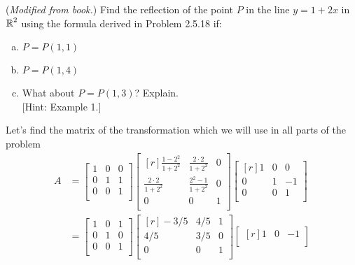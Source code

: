 \documentclass[../main.tex]{subfiles}
\begin{document}
(\emph{Modified from book.})
Find the reflection of the point $P$ in the line $y = 1 + 2x$ in $\operatorname{\mathbb{R}}^2$ using the formula derived in Problem 2.5.18 if:
\begin{enumerate}[a)]
	\item $P = P(1, 1)$
	\item $P = P(1, 4)$
	\item What about $P = P(1, 3)$? Explain. \\
	\hspace{0pt}[Hint: Example 1.]  %
\end{enumerate}

\solution
Let's find the matrix of the transformation which we will use in all parts of the problem
		\begin{align*}
			A
			&=
			\begin{bmatrix}
				1 & 0 & 0 \\
				0 & 1 & 1 \\
				0 & 0 & 1 \\
			\end{bmatrix}
			\begin{bmatrix*}[r]
				\frac{1-2^2}{1+2^2} &  \frac{2\cdot2}{1+2^2} & 0 \\
				\frac{2\cdot2}{1+2^2} & \frac{2^2-1}{1+2^2} & 0 \\
				0 & 0 & 1 \\
			\end{bmatrix*}
			\begin{bmatrix*}[r]
				1 & 0 & 0 \\
				0 & 1 & -1 \\
				0 & 0 & 1 \\
			\end{bmatrix*}
			\\&=
			\begin{bmatrix}
				1 & 0 & 1 \\
				0 & 1 & 0 \\
				0 & 0 & 1 \\
			\end{bmatrix}
			\begin{bmatrix*}[r]
				-3/5 & 4/5 & 1 \\
				4/5 & 3/5 & 0 \\
				0 & 0 & 1 \\
			\end{bmatrix*}
			\begin{bmatrix*}[r]
				1 & 0 & -1 \\

\end{bmatrix*}
\end{align*}
\end{document}
